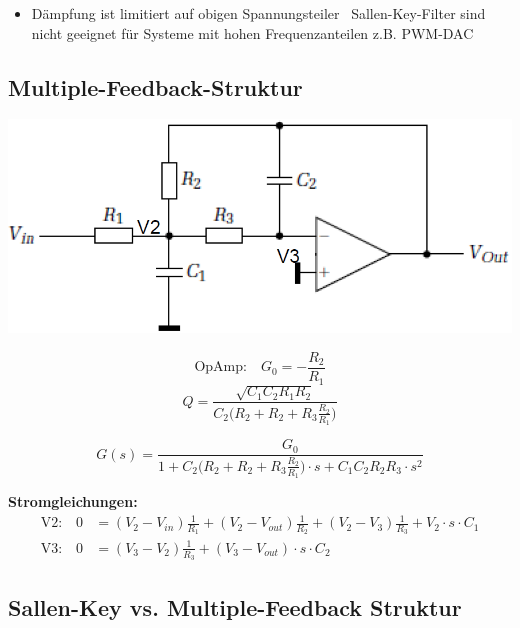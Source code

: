 \begin{itemize}
    \item Dämpfung ist limitiert auf obigen Spannungsteiler
        \textrightarrow\ Sallen-Key-Filter sind nicht geeignet für Systeme mit hohen Frequenzanteilen z.B. PWM-DAC
\end{itemize}


\subsection{Multiple-Feedback-Struktur}

\begin{minipage}[c]{0.4\columnwidth}
    \includegraphics[width=\columnwidth]{images/aktive_filter_multiple_feedback.png}
\end{minipage}
\hfill
\begin{minipage}[c]{0.58\columnwidth}
    $$ \text{OpAmp:} \quad  G_0 = -\frac{R_2}{R_1} $$
    $$ Q = \frac{\sqrt{C_1 C_2 R_1 R_2}}{ C_2 \Big( R_2 + R_2 + R_3 \frac{R_2}{R_1} \Big)} $$
\end{minipage}

$$ \boxed{ G(s) = \frac{G_0}{1 + C_2 \Big( R_2 + R_2 + R_3 \frac{R_2}{R_1} \Big) \cdot s + C_1 C_2 R_2 R_3 \cdot s^2 }}$$

\textbf{Stromgleichungen:}
\begin{align*}
    \text{V2:} \quad 0 &= (V_2 - V_{in}) \frac{1}{R_1} + (V_2 - V_{out}) \frac{1}{R_2} + (V_2 - V_3) \frac{1}{R_3} + V_2 \cdot s \cdot C_1  \\
    \text{V3:} \quad 0 &= (V_3 - V_2) \frac{1}{R_3} + (V_3 - V_{out})  \cdot s \cdot C_2 
\end{align*}

\subsection{Sallen-Key vs. Multiple-Feedback Struktur}

